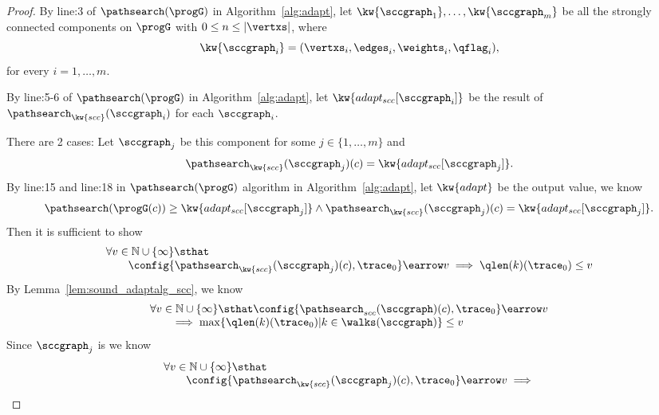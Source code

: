 \begin{proof}
  By line:3 of $\pathsearch(\progG)$ in Algorithm~\ref{alg:adapt}, let $\kw{\sccgraph_1}, \ldots, \kw{\sccgraph_m}$ be all the strongly connected components on $\progG$ with $0 \leq n \leq |\vertxs|$,
  where 
  \[
    \kw{\sccgraph_i} = (\vertxs_i, \edges_i, \weights_i, \qflag_i),
  \]
  for every $i = 1, \ldots, m$. 

  By line:5-6 of $\pathsearch(\progG)$  in Algorithm~\ref{alg:adapt}, 
  let $\kw{adapt_{scc}[\sccgraph_i]}$ be the result of $\pathsearch_{\kw{scc}}(\sccgraph_i)$ for each $\sccgraph_i$.

  There are 2 cases:
  Let  $\sccgraph_{j}$ be this component for some $j \in \{ 1, \ldots, m\}$ and
  \[
    \pathsearch_{\kw{scc}}(\sccgraph_j) (c) =  \kw{adapt_{scc}[\sccgraph_j]}.
  \]
  By line:15 and line:18 in $\pathsearch(\progG)$ algorithm in Algorithm~\ref{alg:adapt}, 
  let $\kw{adapt}$ be the output value,
  we know 
  \[
    \pathsearch(\progG(c))  \geq \kw{adapt_{scc}[\sccgraph_j]} 
    \land \pathsearch_{\kw{scc}}(\sccgraph_j) (c) =  \kw{adapt_{scc}[\sccgraph_j]}.
  \]
  Then it is sufficient to show
  \[
    \begin{array}{l}
      \forall v \in \mathbb{N} \cup \{\infty\} \sthat
      \\ \qquad 
      \config{\pathsearch_{\kw{scc}}(\sccgraph_j)(c), \trace_0} \earrow v
      \implies
    \qlen(k)(\trace_0) \leq v
  \end{array}
    \]
  By Lemma~\ref{lem:sound_adaptalg_scc}, we know
  \[
    \begin{array}{l}
      \forall v \in \mathbb{N} \cup \{\infty\} \sthat
      \config{\pathsearch_{scc}(\sccgraph)(c), \trace_0} \earrow v
    \\ \qquad   \implies
    \max\{\qlen(k)(\trace_0) | k \in \walks(\sccgraph)\} \leq v
  \end{array}
  \]
Since $\sccgraph_j $ is we know 
  \[
    \begin{array}{l}
      \forall v \in \mathbb{N} \cup \{\infty\} \sthat
      \\ \qquad 
      \config{\pathsearch_{\kw{scc}}(\sccgraph_j)(c), \trace_0} \earrow v
      \implies

\end{array}\]
\end{proof}
